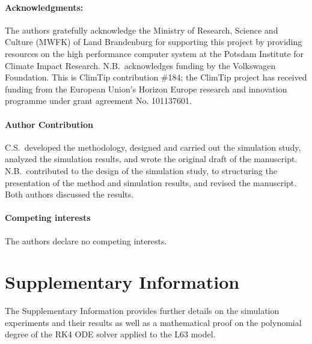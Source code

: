 \documentclass{article}
\begin{document}
\paragraph*{Acknowledgments:}
The authors gratefully acknowledge the Ministry of Research, Science and Culture (MWFK) of Land Brandenburg for supporting this project by providing resources on the high performance computer system at the Potsdam Institute for Climate Impact Research. N.B.\ acknowledges funding by the Volkswagen Foundation. This is ClimTip contribution \#184; the ClimTip project has received funding from the European Union's Horizon Europe research and innovation programme under grant agreement No. 101137601. 

\paragraph{Author Contribution}
C.S.\ developed the methodology, designed and carried out the simulation study, analyzed the simulation results, and wrote the original draft of the manuscript. N.B.\ contributed to the design of the simulation study, to structuring the presentation of the method and simulation results, and revised the manuscript. Both authors discussed the results.

\paragraph{Competing interests}
The authors declare no competing interests.
%
%
%
\clearpage
\section*{Supplementary Information} 
%
The Supplementary Information provides further details on the simulation experiments and their results as well as a mathematical proof on the polynomial degree of the RK4 ODE solver applied to the L63 model.






\clearpage

\setcounter{page}{1}
\end{document}
